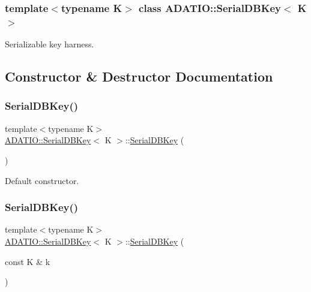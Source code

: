 \subsubsection*{template$<$typename K$>$\newline
class A\+D\+A\+T\+I\+O\+::\+Serial\+D\+B\+Key$<$ K $>$}

Serializable key harness. 



\subsection{Constructor \& Destructor Documentation}
\mbox{\label{classADATIO_1_1SerialDBKey_acaf28250dcc8a2b3944f7edef046df05}} 
\subsubsection{\texorpdfstring{SerialDBKey()}{SerialDBKey()}\hspace{0.1cm}{\footnotesize\ttfamily [1/6]}}
{\footnotesize\ttfamily template$<$typename K$>$ \\
\mbox{\hyperlink{classADATIO_1_1SerialDBKey}{A\+D\+A\+T\+I\+O\+::\+Serial\+D\+B\+Key}}$<$ K $>$\+::\mbox{\hyperlink{classADATIO_1_1SerialDBKey}{Serial\+D\+B\+Key}} (\begin{DoxyParamCaption}{ }\end{DoxyParamCaption})\hspace{0.3cm}{\ttfamily [inline]}}



Default constructor. 

\mbox{\label{classADATIO_1_1SerialDBKey_ad035f1ac5d8565aec4e5a7197333123f}} 
\subsubsection{\texorpdfstring{SerialDBKey()}{SerialDBKey()}\hspace{0.1cm}{\footnotesize\ttfamily [2/6]}}
{\footnotesize\ttfamily template$<$typename K$>$ \\
\mbox{\hyperlink{classADATIO_1_1SerialDBKey}{A\+D\+A\+T\+I\+O\+::\+Serial\+D\+B\+Key}}$<$ K $>$\+::\mbox{\hyperlink{classADATIO_1_1SerialDBKey}{Serial\+D\+B\+Key}} (\begin{DoxyParamCaption}\item[{const K \&}]{k }\end{DoxyParamCaption})\hspace{0.3cm}{\ttfamily [inline]}}



